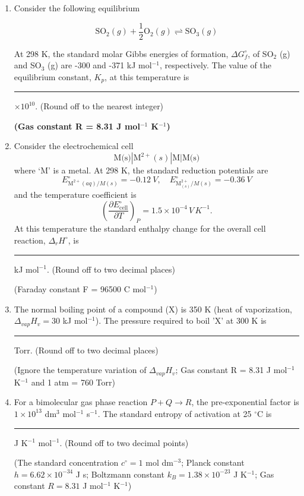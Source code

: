 \documentclass[journal,12pt,onecolumn]{IEEEtran}
\theoremstyle{remark}
\begin{document}
\begin{enumerate}
\item Consider the following equilibrium \hfill{}

\[
\text{SO}_2 (g) + \frac{1}{2} \text{O}_2 (g) \rightleftharpoons \text{SO}_3 (g)
\]

At 298 K, the standard molar Gibbs energies of formation, \(\Delta G_f^\circ\), of SO\(_2\) (g) and SO\(_3\) (g) are -300 and -371 kJ mol\(^{-1}\), respectively. The value of the equilibrium constant, \(K_p\), at this temperature is \rule{2cm}{0.15mm} \(\times 10^{10}\). (Round off to the nearest integer)

\textbf{(Gas constant R = 8.31 J mol\(^{-1}\) K\(^{-1}\))}




\item Consider the electrochemical cell
\[
\text{M(s)}|\text{M}^{2+}(s)|\text{M}|\text{M(s)}
\]
where `M' is a metal. At 298 K, the standard reduction potentials are 
\[
E^\circ_{\text{M}^{2+}(aq)/M(s)} = -0.12~V, \quad
E^\circ_{\text{M}^{2+}_{(s)}/M(s)} = -0.36~V
\]
and the temperature coefficient is
\[
\left(\frac{\partial E^\circ_{\text{cell}}}{\partial T}\right)_P = 1.5 \times 10^{-4} \, V\,K^{-1}.
\]
At this temperature the standard enthalpy change for the overall cell reaction, \(\Delta_r H^\circ\), is \rule{2cm}{0.15mm} kJ mol\(^{-1}\). (Round off to two decimal places)

(Faraday constant F = 96500 C mol\(^{-1}\))

\item The normal boiling point of a compound (X) is 350 K (heat of vaporization, \(\Delta_{vap}H_v = 30\) kJ mol\(^{-1}\)). The pressure required to boil 'X' at 300 K is \rule{2cm}{0.15mm} Torr. (Round off to two decimal places)

(Ignore the temperature variation of \(\Delta_{vap}H_v\); Gas constant R = 8.31 J mol\(^{-1}\) K\(^{-1}\) and 1 atm = 760 Torr)

\item For a bimolecular gas phase reaction \(P + Q \rightarrow R\), the pre-exponential factor is \(1 \times 10^{13}\) dm\(^3\) mol\(^{-1}\) s\(^{-1}\). The standard entropy of activation at 25 \(^{\circ}\)C is \rule{2cm}{0.15mm} J K\(^{-1}\) mol\(^{-1}\). (Round off to two decimal points)

(The standard concentration \(c^\circ = 1\) mol dm\(^{-3}\); Planck constant \(h = 6.62 \times 10^{-34}\) J s; Boltzmann constant \(k_B = 1.38 \times 10^{-23}\) J K\(^{-1}\); Gas constant \(R = 8.31\) J mol\(^{-1}\) K\(^{-1}\))


\end{enumerate}
\end{document}

